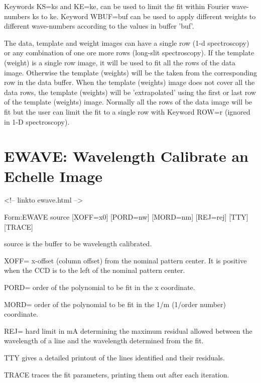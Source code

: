 Keywords KS=ks and KE=ke, can be used to limit the fit within Fourier
wave-numbers ks to ke. Keyword WBUF=buf can be used to apply different
weights to different wave-numbers according to the values in buffer 'buf'.

The data, template and weight images can have a single row (1-d
spectroscopy) or any combination of one ore more rows (long-slit
spectroscopy). If the template (weight) is a single row image, it will be
used to fit all the rows of the data image. Otherwise the template
(weights) will be the taken from the corresponding row in the data
buffer. When the template (weights) image does not cover all the data rows,
the template (weights) will be 'extrapolated' using the first or last row
of the template (weights) image. Normally all the rows of the data image
will be fit but the user can limit the fit to a single row with Keyword
ROW=r (ignored in 1-D spectroscopy).

\section{EWAVE: Wavelength Calibrate an Echelle Image}
\begin{rawhtml}
<!-- linkto ewave.html -->
\end{rawhtml}
\begin{command}
  \item[Form:EWAVE source {[XOFF=x0]} {[PORD=nw]} {[MORD=nm]} {[REJ=rej]} 
       {[TTY]} {[TRACE]} \hfill]{}
  \item[source]{is the buffer to be wavelength calibrated.}
  \item[XOFF=]{x-offset (column offset) from the nominal 
       pattern center. It is positive when the CCD
       is to the left of the nominal pattern center.}
  \item[PORD=]{order of the polynomial to be fit in the x coordinate.}
  \item[MORD=]{order of the polynomial to be fit in the 1/m
       (1/order number) coordinate.}
  \item[REJ=]{hard limit in mA determining the maximum residual
       allowed between the wavelength of a line and the
       wavelength determined from the fit.}
  \item[TTY]{gives a detailed printout of the lines identified and 
       their residuals.}
  \item[TRACE]{traces the fit parameters, printing them out after each 
       iteration.}
\end{command}

